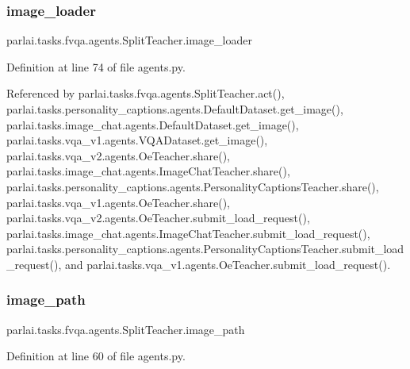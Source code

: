 \subsubsection{\texorpdfstring{image\+\_\+loader}{image\_loader}}
{\footnotesize\ttfamily parlai.\+tasks.\+fvqa.\+agents.\+Split\+Teacher.\+image\+\_\+loader}



Definition at line 74 of file agents.\+py.



Referenced by parlai.\+tasks.\+fvqa.\+agents.\+Split\+Teacher.\+act(), parlai.\+tasks.\+personality\+\_\+captions.\+agents.\+Default\+Dataset.\+get\+\_\+image(), parlai.\+tasks.\+image\+\_\+chat.\+agents.\+Default\+Dataset.\+get\+\_\+image(), parlai.\+tasks.\+vqa\+\_\+v1.\+agents.\+V\+Q\+A\+Dataset.\+get\+\_\+image(), parlai.\+tasks.\+vqa\+\_\+v2.\+agents.\+Oe\+Teacher.\+share(), parlai.\+tasks.\+image\+\_\+chat.\+agents.\+Image\+Chat\+Teacher.\+share(), parlai.\+tasks.\+personality\+\_\+captions.\+agents.\+Personality\+Captions\+Teacher.\+share(), parlai.\+tasks.\+vqa\+\_\+v1.\+agents.\+Oe\+Teacher.\+share(), parlai.\+tasks.\+vqa\+\_\+v2.\+agents.\+Oe\+Teacher.\+submit\+\_\+load\+\_\+request(), parlai.\+tasks.\+image\+\_\+chat.\+agents.\+Image\+Chat\+Teacher.\+submit\+\_\+load\+\_\+request(), parlai.\+tasks.\+personality\+\_\+captions.\+agents.\+Personality\+Captions\+Teacher.\+submit\+\_\+load\+\_\+request(), and parlai.\+tasks.\+vqa\+\_\+v1.\+agents.\+Oe\+Teacher.\+submit\+\_\+load\+\_\+request().

\mbox{\label{classparlai_1_1tasks_1_1fvqa_1_1agents_1_1SplitTeacher_a340656d30ffce73b20e4e4eaff111570}} 
\subsubsection{\texorpdfstring{image\+\_\+path}{image\_path}}
{\footnotesize\ttfamily parlai.\+tasks.\+fvqa.\+agents.\+Split\+Teacher.\+image\+\_\+path}



Definition at line 60 of file agents.\+py.



